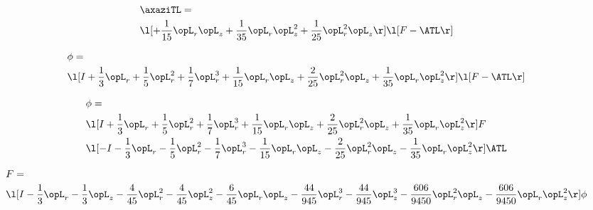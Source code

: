 \begin{alignat}{2} 
\label{eq:linaxaziTL_1} 
& \axaziTL = \\ 
& \l[ + \frac{1}{15} \opL_r \opL_z + \frac{1}{35} \opL_r \opL_z^{2} + \frac{1}{25} \opL_r^{2} \opL_z  \r] \l[ F - \ATL \r] \nonumber \\ 
\end{alignat} 


\begin{alignat}{2} 
\label{eq:scalarFlux_1} 
& \phi = \\ 
& \l[ I + \frac{1}{3} \opL_r + \frac{1}{5} \opL_r^{2} + \frac{1}{7} \opL_r^{3} + \frac{1}{15} \opL_r \opL_z + \frac{2}{25} \opL_r^{2} \opL_z + \frac{1}{35} \opL_r \opL_z^{2}  \r] \l[ F - \ATL \r] \nonumber \\ 
\end{alignat} 


\begin{alignat}{2} 
\label{eq:scalarFlux_2} 
& \phi = \\ 
& \l[ I + \frac{1}{3} \opL_r + \frac{1}{5} \opL_r^{2} + \frac{1}{7} \opL_r^{3} + \frac{1}{15} \opL_r \opL_z + \frac{2}{25} \opL_r^{2} \opL_z + \frac{1}{35} \opL_r \opL_z^{2}  \r] F \nonumber \\ 
& \l[ - I - \frac{1}{3} \opL_r - \frac{1}{5} \opL_r^{2} - \frac{1}{7} \opL_r^{3} - \frac{1}{15} \opL_r \opL_z - \frac{2}{25} \opL_r^{2} \opL_z - \frac{1}{35} \opL_r \opL_z^{2}  \r] \ATL \nonumber \\ 
\end{alignat} 


\begin{alignat}{2} 
\label{eq:transport3D_0} 
& F = \\ 
& \l[ I - \frac{1}{3} \opL_r - \frac{1}{3} \opL_z - \frac{4}{45} \opL_r^{2} - \frac{4}{45} \opL_z^{2} - \frac{6}{45} \opL_r \opL_z - \frac{44}{945} \opL_r^{3} - \frac{44}{945} \opL_z^{3} - \frac{606}{9450} \opL_r^{2} \opL_z - \frac{606}{9450} \opL_r \opL_z^{2}  \r] \phi \nonumber \\ 
\end{alignat} 


